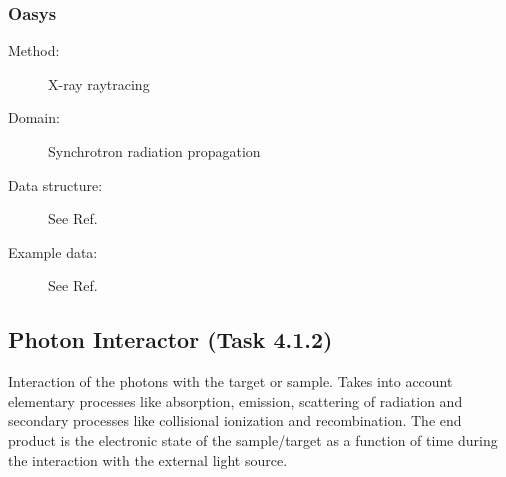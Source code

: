 \documentclass[12pt]{scrartcl}
\begin{document}
%
\subsubsection{Oasys\label{sec:interface_prop_shadow}}
\begin{description}
  \item[Method:] X-ray raytracing
  \item[Domain:] Synchrotron radiation propagation
  \item[Data structure:] See Ref.~\cite{Rio2014}
  \item[Example data:] See Ref.~\cite{Rio2014}
\end{description}
%
\subsection{Photon Interactor (Task 4.1.2)}
Interaction of the photons with the target or sample. Takes into account
elementary processes like absorption, emission, scattering of radiation and
secondary processes like collisional ionization and recombination. The end
product is the electronic state of the sample/target as a function of time
during the interaction with the external light source.
\end{document}
